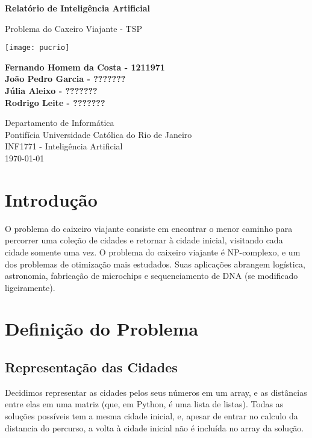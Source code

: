 \documentclass[12pt, a4paper]{article}
\begin{document}
\begin{titlepage}
	\begin{center}
		\vspace*{1cm}

		\Huge
		\textbf{Relatório de Inteligência Artificial}

		\vspace{0.5cm}
		\Large
		Problema do Caxeiro Viajante - TSP

		\vspace{1.5cm}

		\texttt{[image: pucrio]}

		\vspace{1.5cm}

		\normalsize
		\textbf{Fernando Homem da Costa - 1211971}\\
		\textbf{João Pedro Garcia - ???????}\\
		\textbf{Júlia Aleixo - ???????}\\
		\textbf{Rodrigo Leite - ???????}

		\vfill

		\Large
		Departamento de Informática\\
		Pontifícia Universidade Católica do Rio de Janeiro\\
		INF1771 - Inteligência Artificial\\
		\today

	\end{center}
\end{titlepage}

\tableofcontents

\newpage

\section{Introdução}
O problema do caixeiro viajante consiste em encontrar o menor caminho para percorrer uma coleção de cidades e retornar à cidade inicial, visitando cada cidade somente uma vez. O problema do caixeiro viajante é NP-complexo, e um dos problemas de otimização mais estudados. 
Suas aplicações abrangem logística, astronomia, fabricação de microchips e sequenciamento de DNA (se modificado ligeiramente).

\section{Definição do Problema}
	
	\subsection{Representação das Cidades}
		Decidimos representar as cidades pelos seus números em um array, e as distâncias entre elas em uma matriz (que, em Python, é uma lista de listas). Todas as soluções possíveis tem a mesma cidade inicial, e, apesar de entrar no calculo da distancia do percurso, a volta à cidade inicial não é incluída no array da solução.
	
\end{document}
